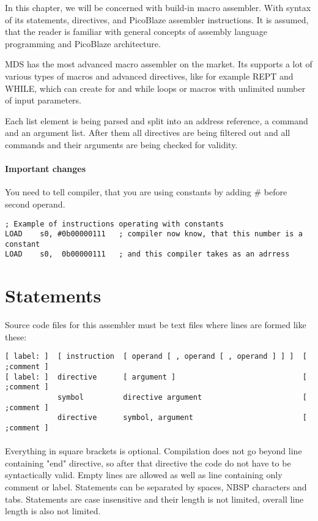 In this chapter, we will be concerned with build-in macro assembler. With syntax of its statements, directives, and PicoBlaze assembler instructions. It is assumed, that the reader is familiar with general concepts of assembly language programming and PicoBlaze architecture.

MDS has the most advanced macro assembler on the market. Its supports a lot of various types of macros and advanced directives, like for example REPT and WHILE, which can create for and while loops or  macros with unlimited number of input parameters.

Each list element is being parsed and split into an address reference, a command and an argument list. After them all directives are being filtered out and all commands and their arguments are being checked for validity.

\paragraph{Important changes}
    You need to tell compiler, that you are using constants by adding \# before second operand.

    {
        \usecodefont
        \verb'; Example of instructions operating with constants'\\
        \verb'LOAD    s0, #0b00000111   ; compiler now know, that this number is a constant'\\
        \verb'LOAD    s0,  0b00000111   ; and this compiler takes as an adrress'\\
    }

\section{Statements}
    Source code files for this assembler must be text files where lines are formed like these:

    {
        \usecodefont
        \verb'[ label: ]  [ instruction  [ operand [ , operand [ , operand ] ] ]  [ ;comment ]'\\
        \verb'[ label: ]  directive      [ argument ]                             [ ;comment ]'\\
        \verb'            symbol         directive argument                       [ ;comment ]'\\
        \verb'            directive      symbol, argument                         [ ;comment ]'\\\\
    }
    Everything in square brackets is optional. Compilation does not go beyond line containing "end" directive, so after that directive the code do not have to be syntactically valid. Empty lines are allowed as well as line containing only comment or label. Statements can be separated by spaces, NBSP characters and tabs. Statements are case insensitive and their length is not limited, overall line length is also not limited.

